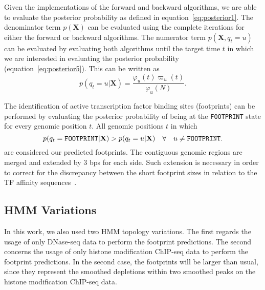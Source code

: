 Given the implementations of the forward and backward algorithms, we are able to evaluate the posterior probability as defined in equation~\ref{eq:posterior1}. The denominator term $ p(\mathbf{X}) $ can be evaluated using the complete iterations for either the forward or backward algorithms. The numerator term $ p(\mathbf{X}, q_t = u) $ can be evaluated by evaluating both algorithms until the target time $ t $ in which we are interested in evaluating the posterior probability (equation~\ref{eq:posterior5}). This can be written as
\begin{equation}
  \label{eq:posterior7}
  p(q_t = u | \mathbf{X}) = \frac{\varphi_u(t) \varpi_u(t)}{\varphi_u(N)}.
\end{equation}

The identification of active transcription factor binding sites (footprints) can be performed by evaluating the posterior probability of being at the {\tt FOOTPRINT} state for every genomic position $ t $. All genomic positions $ t $ in which
\begin{equation}
  \label{eq:posterior8}
  p(q_t = \text{{\tt FOOTPRINT}} | \mathbf{X}) > p(q_t = u | \mathbf{X}) \quad \forall \quad u \neq \text{{\tt FOOTPRINT}}.
\end{equation}
are considered our predicted footprints. The contiguous genomic regions are merged and extended by $3$ bps for each side. Such extension is necessary in order to correct for the discrepancy between the short footprint sizes in relation to the TF affinity sequences~\cite{boyle2011,gusmao2014}.

\subsection{HMM Variations}
\label{sec:hmm.variations}

In this work, we also used two HMM topology variations. The first regards the usage of only DNase-seq data to perform the footprint predictions. The second concerns the usage of only histone modification ChIP-seq data to perform the footprint predictions. In the second case, the footprints will be larger than usual, since they represent the smoothed depletions within two smoothed peaks on the histone modification ChIP-seq data.

